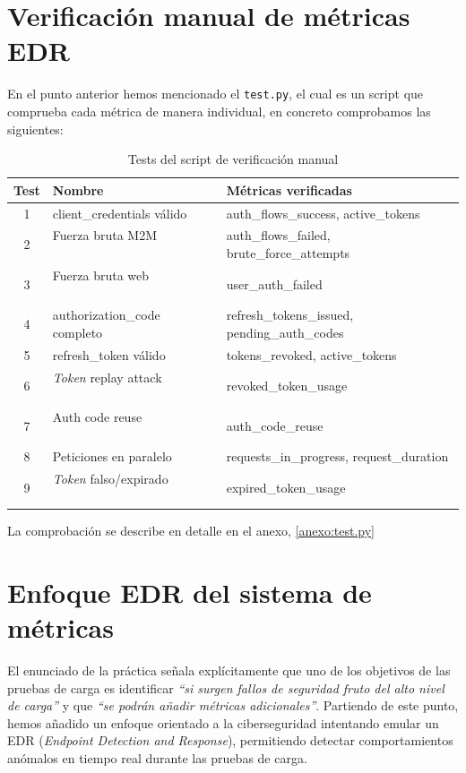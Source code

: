 \documentclass[12pt, a4paper]{article}
\begin{document}
		\section{Verificación manual de métricas EDR}
		En el punto anterior hemos mencionado el \texttt{test.py}, el cual es un script que comprueba cada métrica de manera individual, en concreto comprobamos las siguientes:
		\begin{table}[H]
			\centering
			\begin{tabular}{clp{6cm}}
				\toprule
				\textbf{Test} & \textbf{Nombre} & \textbf{Métricas verificadas} \\
				\midrule
				1 & client\_credentials válido    & auth\_flows\_success, active\_tokens \\
				2 & Fuerza bruta M2M              & auth\_flows\_failed, brute\_force\_attempts \\
				3 & Fuerza bruta web              & user\_auth\_failed \\
				4 & authorization\_code completo  & refresh\_tokens\_issued, pending\_auth\_codes \\
				5 & refresh\_token válido         & tokens\_revoked, active\_tokens \\
				6 & \textit{Token} replay attack           & revoked\_token\_usage \\
				7 & Auth code reuse               & auth\_code\_reuse \\
				8 & Peticiones en paralelo        & requests\_in\_progress, request\_duration \\
				9 & \textit{Token }falso/expirado          & expired\_token\_usage \\
				\bottomrule
			\end{tabular}
			\caption{Tests del script de verificación manual}
		\end{table}
		La comprobación se describe en detalle en el anexo, \ref{anexo:test.py} 
		
		
		
	\newpage
	\section{Enfoque EDR del sistema de métricas}
	
		El enunciado de la práctica señala explícitamente que uno de los objetivos
		de las pruebas de carga es identificar \textit{``si surgen fallos de seguridad
			fruto del alto nivel de carga''} y que \textit{``se podrán añadir métricas
			adicionales''}. Partiendo de este punto, hemos añadido un enfoque orientado
		a la ciberseguridad intentando emular un  EDR (\textit{Endpoint Detection and
			Response}), permitiendo detectar comportamientos anómalos en tiempo real
		durante las pruebas de carga.
		
\end{document}
